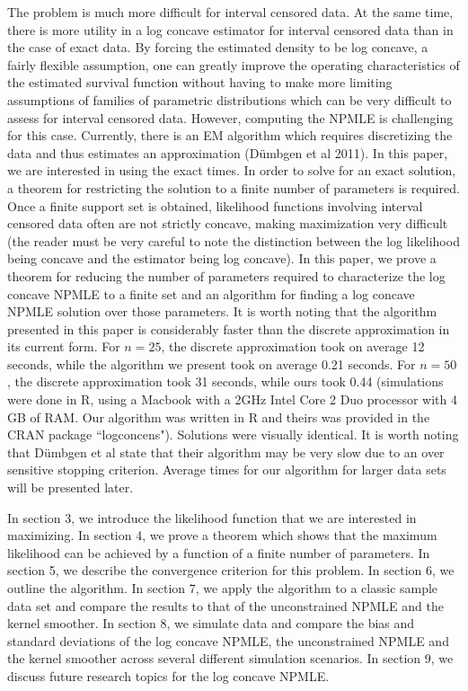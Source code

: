 \documentclass[10pt]{article}
\begin{document}
	
	The problem is much more difficult for interval censored data. At the same time, there is more utility in a log concave estimator for interval censored data than in the case of exact data. By forcing the estimated density to be log concave, a fairly flexible assumption, one can greatly improve the operating characteristics of the estimated survival function without having to make more limiting assumptions of families of parametric distributions which can be very difficult to assess for interval censored data. However, computing the NPMLE is challenging for this case. Currently, there is an EM algorithm which requires discretizing the data and thus estimates an approximation (D\"umbgen et al 2011). In this paper, we are interested in using the exact times. In order to solve for an exact solution, a theorem for restricting the solution to a finite number of parameters is required. Once a finite support set is obtained, likelihood functions involving interval censored data often are not strictly concave, making maximization very difficult (the reader must be very careful to note the distinction between the log likelihood being concave and the estimator being log concave). In this paper, we prove a theorem for reducing the number of parameters required to characterize the log concave NPMLE to a finite set and an algorithm for finding a log concave NPMLE solution over those parameters. It is worth noting that the algorithm presented in this paper is considerably faster than the discrete approximation in its current form. For $n = 25$, the discrete approximation took on average 12 seconds, while the algorithm we present took on average 0.21 seconds. For $n = 50$, the discrete approximation took 31 seconds, while ours took 0.44 (simulations were done in R, using a Macbook with a 2GHz Intel Core 2 Duo processor with 4 GB of RAM. Our algorithm was written in R and theirs was provided in the CRAN package ``logconcens"). Solutions were visually identical. It is worth noting that D\"umbgen et al state that their algorithm may be very slow due to an over sensitive stopping criterion. Average times for our algorithm for larger data sets will be presented later.
	
	In section 3, we introduce the likelihood function that we are interested in maximizing. In section 4, we prove a theorem which shows that the maximum likelihood can be achieved by a function of a finite number of parameters. In section 5, we describe the convergence criterion for this problem. In section 6, we outline the algorithm. In section 7, we apply the algorithm to a classic sample data set and compare the results to that of the unconstrained NPMLE and the kernel smoother. In section 8, we simulate data and compare the bias and standard deviations of the log concave NPMLE, the unconstrained NPMLE and the kernel smoother across several different simulation scenarios. In section 9, we discuss future research topics for the log concave NPMLE.
	 
\end{document}
